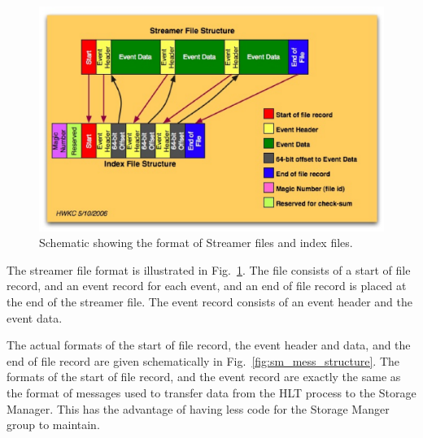 \begin{figure}[hbtp]
  \begin{center}
    \includegraphics[width=5.5in]{Software/sm_messages1.eps}
    \caption{Schematic showing the format of Streamer files and index files.}
    \label{fig:sm_messages1}
  \end{center}
\end{figure}

The streamer file format is illustrated in Fig.~\ref{fig:sm_messages1}. The file
consists of a start of file record, and an event record for each event, and
an end of file record is placed at the end of the streamer file. The event
record consists of an event header and the event data.

The actual formats of the start of file record, the event header and data, and the
end of file record are given schematically in Fig.~\ref{fig:sm_mess_structure}.
The formats of the start of file record, and the event record are exactly the
same as the format of messages used to transfer data from the HLT process to the
Storage Manager. This has the advantage of having less code for the Storage
Manger group to maintain.

